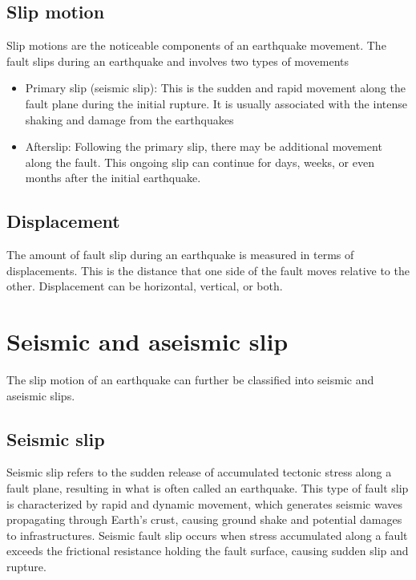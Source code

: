 \subsection{Slip motion}
Slip motions are the noticeable components of an earthquake movement.
The fault slips during an earthquake and involves two types of movements
\begin{itemize}
    \item Primary slip (seismic slip): This is the sudden and rapid movement along the fault plane during the initial rupture. It is usually associated with the intense shaking and damage from the earthquakes
    \item Afterslip: Following the primary slip, there may be additional movement along the fault. This ongoing slip can continue for days, weeks, or even months after the initial earthquake.
\end{itemize}

\subsection{Displacement}
The amount of fault slip during an earthquake is measured in terms of displacements. 
This is the distance that one side of the fault moves relative to the other.
Displacement can be horizontal, vertical, or both.


\section{Seismic and aseismic slip}
The slip motion of an earthquake can further be classified into seismic and aseismic slips.
\subsection{Seismic slip}
Seismic slip refers to the sudden release of accumulated tectonic stress along a fault plane, resulting in what is often called an earthquake.
This type of fault slip is characterized by rapid and dynamic movement, which generates seismic waves propagating through Earth's crust, causing ground shake and potential damages to infrastructures.
Seismic fault slip occurs when stress accumulated along a fault exceeds the frictional resistance holding the fault surface, causing sudden slip and rupture.
